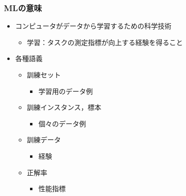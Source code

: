 \documentclass[aspectratio=169, dvipdfmx, 14pt, xcolor={svgnames,dvipsnames}]{beamer}
\def\tightlist{\itemsep1pt\parskip0pt\parsep0pt}
\begin{document}

\begin{frame}
  \frametitle{{MLの意味}}
  \begin{itemize}
    \tightlist
    \item
          コンピュータがデータから学習するための科学技術

          \begin{itemize}
            \tightlist
            \item
                  学習：タスクの測定指標が向上する経験を得ること
          \end{itemize}
    \item
          各種語義

          \begin{itemize}
            \tightlist
            \item
                  訓練セット

                  \begin{itemize}
                    \tightlist
                    \item
                          学習用のデータ例
                  \end{itemize}
            \item
                  訓練インスタンス，標本

                  \begin{itemize}
                    \tightlist
                    \item
                          個々のデータ例
                  \end{itemize}
            \item
                  訓練データ

                  \begin{itemize}
                    \tightlist
                    \item
                          経験
                  \end{itemize}
            \item
                  正解率

                  \begin{itemize}
                    \tightlist
                    \item
                          性能指標
                  \end{itemize}
          \end{itemize}
  \end{itemize}
\end{frame}
\end{document}
